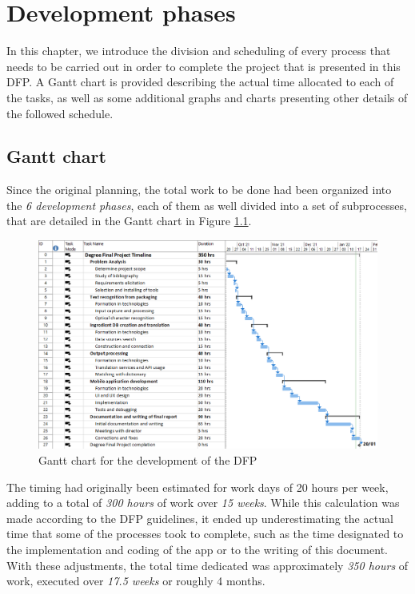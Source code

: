 \chapter{Development phases}
\label{chapter3}

In this chapter, we introduce the division and scheduling of every process that needs to be carried out in order to complete the project that is presented in this DFP. A Gantt chart is provided describing the actual time allocated to each of the tasks, as well as some additional graphs and charts presenting other details of the followed schedule.

\section{Gantt chart}

Since the original planning, the total work to be done had been organized into the \textit{6 development phases}, each of them as well divided into a set of subprocesses, that are detailed in the Gantt chart in Figure \ref{fig:gantt}.

\begin{figure}[h]
  \centering
  \includegraphics[width=\textwidth]{Figures/gantt.png}
  \caption{%
    Gantt chart for the development of the DFP
  }
  \label{fig:gantt}
\end{figure}

The timing had originally been estimated for work days of 20 hours per week, adding to a total of \textit{300 hours} of work over \textit{15 weeks}. While this calculation was made according to the DFP guidelines, it ended up underestimating the actual time that some of the processes took to complete, such as the time designated to the implementation and coding of the app or to the writing of this document. With these adjustments, the total time dedicated was approximately \textit{350 hours} of work, executed over \textit{17.5 weeks} or roughly 4 months.

